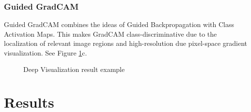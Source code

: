 \documentclass{article}
\begin{document}
\subsubsection{Guided GradCAM}
Guided GradCAM\cite{SelvarajuDVCPB16} combines the ideas of Guided Backpropagation with Class Activation Maps.
This makes GradCAM class-discriminative due to the localization of relevant image regions and high-resolution due pixel-space gradient visualization. See Figure \ref{deepVis}c.
\begin{figure}[H]
  \centering
  \hspace{0.5cm}
  \hspace{0.5cm}
  \caption{Deep Visualization result example}
  \label{deepVis}
\end{figure}

\section{Results}
\end{document}
